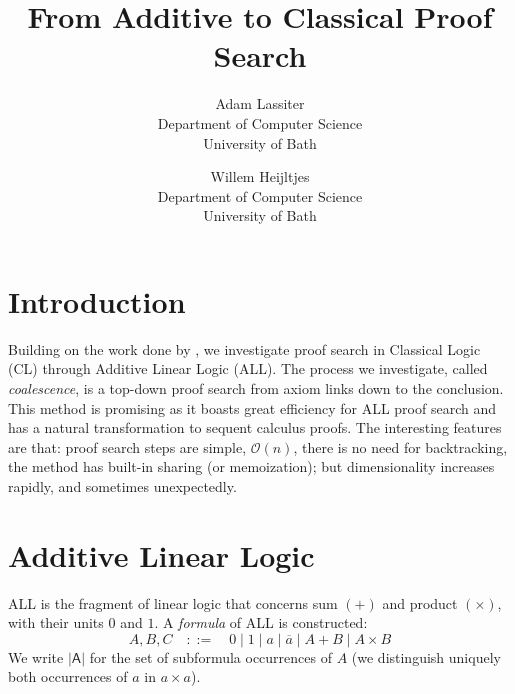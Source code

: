 \documentclass{article}
\title{From Additive to Classical Proof Search}
\author{Adam Lassiter\\Department of Computer Science\\University of Bath \and Willem Heijltjes\\Department of Computer Science\\University of Bath}
\date{}
\newcommand\0{0}
\newcommand\1{1}
\newcommand\+{+}
\renewcommand\*{\times}
\newcommand\subs[1]{\mathsf{|#1|}}
\def\defeq{::=}
\newcommand\dual{\overline}
\begin{document}
    {\let\newpage\relax\maketitle}

    \maketitle


    \section*{Introduction}
        Building on the work done by \citet{petri-nets}, we investigate proof search in Classical Logic (CL) through Additive Linear Logic (ALL).
        The process we investigate, called \emph{coalescence}, is a top-down proof search from axiom links down to the conclusion.
        This method is promising as it boasts great efficiency for ALL proof search and has a natural transformation to sequent calculus proofs.
        The interesting features are that: proof search steps are simple, $\mathcal{O}(n)$, there is no need for backtracking, the method has built-in sharing (or memoization); but dimensionality increases rapidly, and sometimes unexpectedly.



    \section*{Additive Linear Logic}
        ALL is the fragment of linear logic that concerns sum $(+)$ and product $(\*)$, with their units $0$ and $1$.
        A \emph{formula} of ALL is constructed:
        \begin{equation*}
            A, B, C \quad \defeq \quad 0 \mid 1 \mid a \mid \dual a \mid A + B \mid A \* B
        \end{equation*}
        We write $\subs A$ for the set of subformula occurrences of $A$ (we distinguish uniquely both occurrences of $a$ in $a\*a$).
\end{document}
